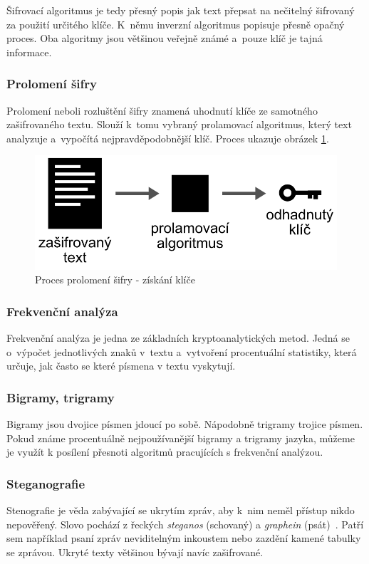 \documentclass[glossaries, index]{kidiplom}
\begin{document}
Šifrovací algoritmus je tedy přesný popis jak text přepsat na nečitelný šifrovaný za použití určitého klíče. K~němu inverzní algoritmus popisuje přesně opačný proces. Oba algoritmy jsou většinou veřejně známé a~pouze klíč je tajná informace.

\subsubsection{Prolomení šifry}
Prolomení neboli rozluštění šifry znamená uhodnutí klíče ze samotného zašifrovaného textu. Slouží k~tomu vybraný prolamovací algoritmus, který text analyzuje a~vypočítá nejpravděpodobnější klíč. Proces ukazuje obrázek \ref{crackcode}.

\begin{figure}[htbp]
\centering
\includegraphics[scale=0.25]{graphics/cracking.png}
\caption{Proces prolomení šifry - získání klíče}
\label{crackcode}
\end{figure}

\subsubsection{Frekvenční analýza}
Frekvenční analýza je jedna ze základních kryptoanalytických metod. Jedná se o~výpočet jednotlivých znaků v~textu a~vytvoření procentuální statistiky, která určuje, jak často se které písmena v textu vyskytují.

\subsubsection{Bigramy, trigramy}
Bigramy jsou dvojice písmen jdoucí po sobě. Nápodobně trigramy trojice písmen. Pokud známe procentuálně nejpoužívanější bigramy a trigramy jazyka, můžeme je využít k posílení přesnoti algoritmů pracujících s frekvenční analýzou.

\subsubsection{Steganografie}
Stenografie je věda zabývající se ukrytím zpráv, aby k~nim neměl přístup nikdo nepověřený. Slovo pochází z řeckých \textit{steganos} (schovaný) a \textit{graphein} (psát)~\cite{singh2009}. Patří sem například psaní zpráv neviditelným inkoustem nebo zazdění kamené tabulky se zprávou. Ukryté texty většinou bývají navíc zašifrované.
\end{document}
